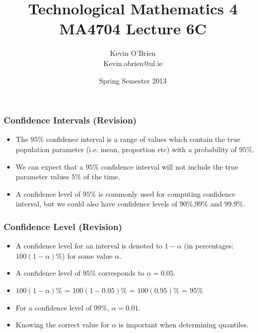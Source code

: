 \documentclass[a4]{beamer}
\title[MA4704]{Technological Mathematics 4 \\ {\normalsize MA4704 Lecture 6C}}
\author[Kevin O'Brien]{Kevin O'Brien \\ {\scriptsize Kevin.obrien@ul.ie}}
\date{Spring Semester 2013}
\institute[Maths \& Stats]{Dept. of Mathematics \& Statistics, \\ University \textit{of} Limerick}
\begin{document}
\begin{frame}
\titlepage
\end{frame}





\begin{frame}
\frametitle{Confidence Intervals (Revision) }

\begin{itemize}
\item The $95\%$ confidence interval is a range of values which contain the true population parameter (i.e. mean, proportion etc) with a probability of $95\%$.
\item We can expect that a $95\%$ confidence interval will not include the true parameter values $5\%$ of the time.
\item A confidence level of $95\%$ is commonly used for computing confidence interval, but we could also have confidence levels of $90\%$,$99\%$ and $99.9\%$.
\end{itemize}

\end{frame}



\begin{frame}
\frametitle{Confidence Level (Revision) }

\begin{itemize}
\item A confidence level for an interval is denoted to $1-\alpha$ (in percentages: $100(1-\alpha)\%$) for some value $\alpha$.
\item A confidence level of $95\%$ corresponds to $\alpha = 0.05$.
\item $100(1-\alpha)\%$ = $100(1-0.05)\%$  = $100(0.95)\%$ = $95\%$
\item For a confidence level of $99\%$, $\alpha = 0.01$.
\item Knowing the correct value for $\alpha$ is important when determining quantiles.
\end{itemize}

\end{frame}
\end{document}
